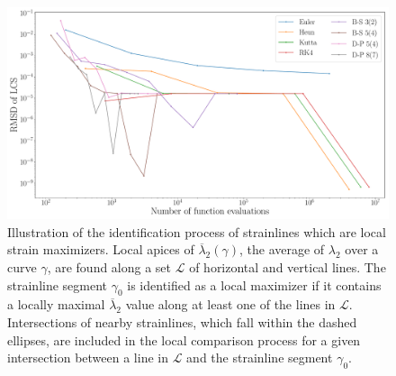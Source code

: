 \begin{figure}[htpb]
    \centering
    \includegraphics[width=0.8\linewidth]{figures/error_figures/lcs_errors_fixed_and_adaptive_steplength.pdf}
    \caption[The identification process of strainlines which HOES BE AT BOI YE BOI BOII YE BOIIIII
    are local strain maximizers]{Illustration of the identification process of
        strainlines which are local strain maximizers.
        Local apices of $\overline{\lambda}_{2}(\gamma)$, the average of
        $\lambda_{2}$ over a curve $\gamma$, are found along a set $\mathcal{L}$
        of horizontal and vertical lines. The strainline segment
    $\gamma_{0}$ is identified as a local maximizer if it contains a locally
maximal $\overline{\lambda}_{2}$ value along at least one of the lines in
$\mathcal{L}$. Intersections of nearby strainlines, which fall within the dashed
ellipses, are included in the local comparison process for a given intersection
between a line in $\mathcal{L}$ and the strainline segment $\gamma_{0}$.}
    \label{fig:xi2err}
\end{figure}
